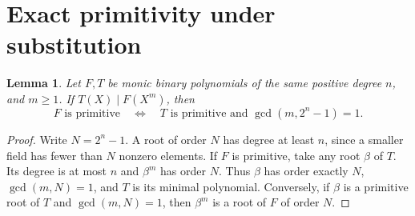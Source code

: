 \documentclass[11pt]{article}
\newtheorem{lemma}[theorem]{Lemma}
\begin{document}
\section{Exact primitivity under substitution}\label{sec:four-ap}
\begin{lemma}\label{lem:sampling}
Let \(F,T\) be monic binary polynomials of the same positive degree \(n\),
and \(m\ge1\). If \(T(X)\mid F(X^m)\), then
\[
 F\text{ is primitive}\quad\Longleftrightarrow\quad
 T\text{ is primitive and }\gcd(m,2^n-1)=1 .
\]
\end{lemma}
\begin{proof}
Write \(N=2^n-1\). A root of order \(N\) has degree at least \(n\),
since a smaller field has fewer than \(N\) nonzero elements.
If \(F\) is primitive, take any root \(\beta\) of \(T\).
Its degree is at most \(n\) and \(\beta^m\) has order \(N\).
Thus \(\beta\) has order exactly \(N\), \(\gcd(m,N)=1\), and \(T\) is
its minimal polynomial. Conversely, if \(\beta\) is a primitive root
of \(T\) and \(\gcd(m,N)=1\), then \(\beta^m\) is a root of \(F\)
of order \(N\).
\end{proof}
\end{document}
